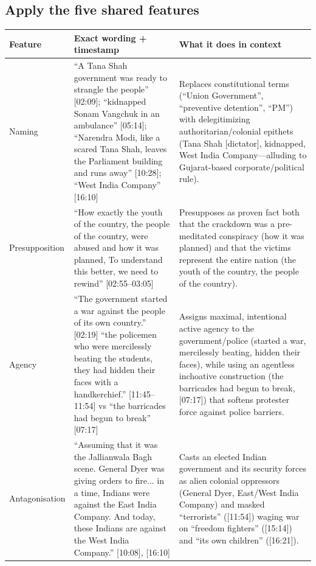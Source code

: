 \documentclass[10pt,a4paper]{article}
\begin{document}
\subsection*{Apply the five shared features}
\par\vspace{4pt}
{\small
\begin{longtable}{@{}>{\raggedright\arraybackslash}p{} >{\raggedright\arraybackslash}p{} >{\raggedright\arraybackslash}p{}@{}}
\toprule
\textbf{Feature} & \textbf{Exact wording + timestamp} & \textbf{What it does in context} \\
\midrule
\endhead
Naming & ``A Tana Shah government was ready to strangle the people'' [02:09]; ``kidnapped Sonam Vangchuk in an ambulance'' [05:14]; ``Narendra Modi, like a scared Tana Shah, leaves the Parliament building and runs away'' [10:28]; ``West India Company'' [16:10] & Replaces constitutional terms (``Union Government'', ``preventive detention'', ``PM'') with delegitimizing authoritarian/colonial epithets (Tana Shah [dictator], kidnapped, West India Company---alluding to Gujarat-based corporate/political rule). \\
\addlinespace[6pt]
Presupposition & ``How exactly the youth of the country, the people of the country, were abused and how it was planned, To understand this better, we need to rewind'' [02:55--03:05] & Presupposes as proven fact both that the crackdown was a pre-meditated conspiracy (how it was planned) and that the victims represent the entire nation (the youth of the country, the people of the country). \\
\addlinespace[6pt]
Agency & ``The government started a war against the people of its own country.'' [02:19] \newline  ``the policemen who were mercilessly beating the students, they had hidden their faces with a handkerchief.'' [11:45--11:54] vs ``the barricades had begun to break'' [07:17] & Assigns maximal, intentional active agency to the government/police (started a war, mercilessly beating, hidden their faces), while using an agentless inchoative construction (the barricades had begun to break, [07:17]) that softens protester force against police barriers. \\
\addlinespace[6pt]
Antagonisation & ``Assuming that it was the Jallianwala Bagh scene. General Dyer was giving orders to fire... in a time, Indians were against the East India Company. And today, these Indians are against the West India Company.'' [10:08], [16:10] & Casts an elected Indian government and its security forces as alien colonial oppressors (General Dyer, East/West India Company) and masked ``terrorists'' ([11:54]) waging war on ``freedom fighters'' ([15:14]) and ``its own children'' ([16:21]). \\

\end{longtable}}
\end{document}

